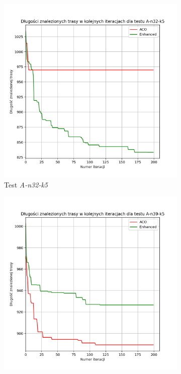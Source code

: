 \documentclass[10pt]{article}
\begin{document}
\begin{figure}[H]
     \centering
     \begin{subfigure}[b]{0.4\textwidth}
         \centering
         \includegraphics[width=\textwidth]{iterations_enhanced_1.png}
         \caption{Test \textit{A-n32-k5}}
     \end{subfigure}
     \hfill
     \begin{subfigure}[b]{0.4\textwidth}
         \centering
         \includegraphics[width=\textwidth]{iterations_enhanced_2.png}

\end{subfigure}
\end{figure}
\end{document}
